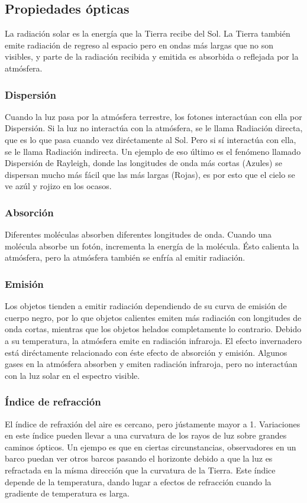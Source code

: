 \documentclass{article}
\begin{document}
\subsection{Propiedades ópticas}
La radiación solar es la energía que la Tierra recibe del Sol. La Tierra también emite radiación de regreso al espacio pero en ondas más largas que no son visibles, y parte de la radiación recibida y emitida es absorbida o reflejada por la atmósfera.

\subsubsection{Dispersión}
Cuando la luz pasa por la atmósfera terrestre, los fotones interactúan con ella por Dispersión. Si la luz no interactúa con la atmósfera, se le llama Radiación directa, que es lo que pasa cuando vez diréctamente al Sol. Pero si sí interactúa con ella, se le llama Radiación indirecta.
Un ejemplo de eso último es el fenómeno llamado Dispersión de Rayleigh, donde las longitudes de onda más cortas (Azules) se dispersan mucho más fácil que las más largas (Rojas), es por esto que el cielo se ve azúl y rojizo en los ocasos.

\subsubsection{Absorción}
Diferentes moléculas absorben diferentes longitudes de onda. Cuando una molécula absorbe un fotón, incrementa la energía de la molécula.
Ésto calienta la atmósfera, pero la atmósfera también se enfría al emitir radiación.

\subsubsection{Emisión}
Los objetos tienden a emitir radiación dependiendo de su curva de emisión de cuerpo negro, por lo que objetos calientes emiten más radiación con longitudes de onda cortas, mientras que los objetos helados completamente lo contrario.
Debido a su temperatura, la atmósfera emite en radiación infraroja. El efecto invernadero está diréctamente relacionado con éste efecto de absorción y emisión. Algunos gases en la atmósfera absorben y emiten radiación infraroja, pero no interactúan con la luz solar en el espectro visible.
\subsubsection{Índice de refracción}
El índice de refraxión del aire es cercano, pero jústamente mayor a 1. Variaciones en este índice pueden llevar a una curvatura de los rayos de luz sobre grandes caminos ópticos. Un ejempo es que en ciertas circunstancias, observadores en un barco puedan ver otros barcos pasando el horizonte debido a que la luz es refractada en la mísma dirección que la curvatura de la Tierra.
Este índice depende de la temperatura, dando lugar a efectos de refracción cuando la gradiente de temperatura es larga.
\end{document}
